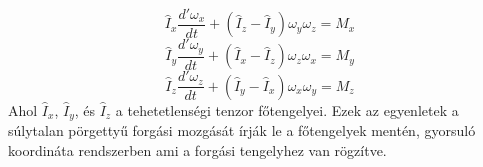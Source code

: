 \documentclass[a4paper,12pt]{article}
\begin{document}
\begin{equation}
    \hat{I}_x \frac{d'\omega_x}{dt} + (\hat{I}_z - \hat{I}_y) \omega_y \omega_z = M_x
\end{equation}
\begin{equation}
    \hat{I}_y \frac{d'\omega_y}{dt} + (\hat{I}_x - \hat{I}_z) \omega_z \omega_x = M_y
\end{equation}
\begin{equation}
    \hat{I}_z \frac{d'\omega_z}{dt} + (\hat{I}_y - \hat{I}_x) \omega_x \omega_y = M_z
\end{equation}
Ahol $\hat{I}_x$, $\hat{I}_y$, és $\hat{I}_z$ a tehetetlenségi tenzor főtengelyei. Ezek az egyenletek a súlytalan pörgettyű forgási mozgását írják le a főtengelyek mentén, gyorsuló koordináta rendszerben ami a forgási tengelyhez van rögzítve.
\end{document}
